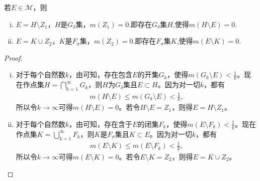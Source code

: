\documentclass[../../main.tex]{subfiles}%
\begin{document}
\begin{theorem}\label{theorem:定理2.14}
若$E\in\mathscr{M}$，则
\begin{enumerate}[(i)]
\item $E = H\setminus Z_1$，$H$是$G_\delta$集，$m(Z_1)=0$.即存在$G_\delta$集$H$,使得$m(H\setminus E)=0$.

\item $E = K\cup Z_2$，$K$是$F_\sigma$集，$m(Z_2)=0$.即存在$F_\sigma$集$K$,使得$m(E\setminus K)=0$.
\end{enumerate}
\end{theorem}
\begin{proof}
\begin{enumerate}[(i)]
\item 对于每个自然数$k$，由可知，存在包含$E$的开集$G_k$，使得$m(G_k\setminus E)<\frac{1}{k}$。现在作点集$H = \bigcap_{k = 1}^{\infty}G_k$，则$H$为$G_\delta$集且$E\subset H$。因为对一切$k$，都有
\begin{align*}
m(H\setminus E)\leqslant m(G_k\setminus E)<\frac{1}{k},
\end{align*}
所以令$k\to \infty$可得$m(H\setminus E)=0$。若令$H\setminus E = Z_1$，则得$E = H\setminus Z_1$。
\item 对于每个自然数$k$，由可知，存在含于$E$的闭集$F_k$，使得$m(E\setminus F_k)<\frac{1}{k}$。现在作点集$K = \bigcup_{k = 1}^{\infty}F_k$，则$K$是$F_\sigma$集且$K\subset E$。因为对一切$k$，都有
\begin{align*}
m(E\setminus K)\leqslant m(E\setminus F_k)<\frac{1}{k},
\end{align*}
所以令$k\to \infty$可得$m(E\setminus K)=0$。若令$E\setminus K = Z_2$，则得$E = K\cup Z_2$。
\end{enumerate}

\end{proof} 
\end{document}
